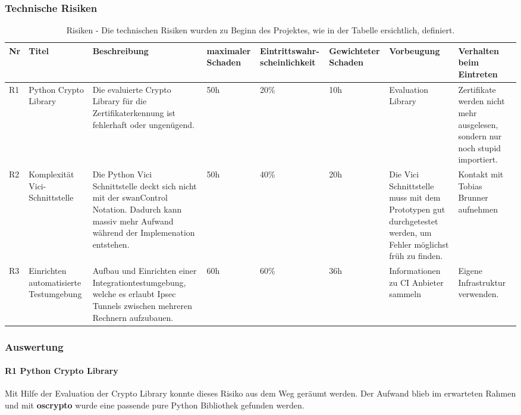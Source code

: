 \begin{landscape}
\subsubsection{Technische Risiken}
\begin{table}[H]
    \begin{tabular}{|p{0.4cm}|p{2.5cm}|p{7cm}|p{1.5cm}|p{2.25cm}|p{1.75cm}|p{3cm}|p{4cm}|}
    \hline    
    \rowcolor{lightblue}
    Nr & Titel & Beschreibung & maximaler Schaden & Eintrittswahr-scheinlichkeit & Gewichteter Schaden & Vorbeugung & Verhalten beim Eintreten \\ \hline
	R1 & Python Crypto Library & Die evaluierte Crypto Library für die Zertifikaterkennung ist fehlerhaft oder ungenügend. & 50h & 20\% & 10h & Evaluation Library & Zertifikate werden nicht mehr ausgelesen, sondern nur noch stupid importiert. \\ \hline
	R2 & Komplexität Vici-Schnittstelle & Die Python Vici Schnittstelle deckt sich nicht mit der swanControl Notation. Dadurch kann massiv mehr Aufwand während der Implemenation entstehen. & 50h & 40\% & 20h & Die Vici Schnittstelle muss mit dem Prototypen gut durchgetestet werden, um Fehler möglichst früh zu finden. & Kontakt mit Tobias Brunner aufnehmen \\ \hline
	R3 & Einrichten automatisierte Testumgebung & Aufbau und Einrichten einer Integrationtestumgebung, welche es erlaubt Ipsec Tunnels zwischen mehreren Rechnern aufzubauen. & 60h & 60\% & 36h & Informationen zu CI Anbieter sammeln & Eigene Infrastruktur verwenden. \\ \hline
    \end{tabular}
    \caption[Risiken]{Risiken - Die technischen Risiken wurden zu Beginn des Projektes, wie in der Tabelle ersichtlich, definiert.}
\end{table}
\end{landscape}

\subsubsection{Auswertung}
\paragraph{R1 Python Crypto Library} Mit Hilfe der Evaluation der Crypto Library konnte dieses Risiko aus dem Weg geräumt werden. Der Aufwand blieb im erwarteten Rahmen und mit \textbf{oscrypto} wurde eine passende pure Python Bibliothek gefunden werden.

